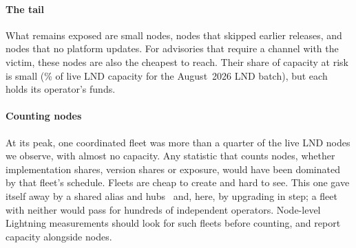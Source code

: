 \paragraph{The tail}
What remains exposed are small nodes, nodes that skipped earlier releases, and nodes that no platform updates. For
advisories that require a channel with the victim, these nodes are also the cheapest to reach. Their share of
capacity at risk is small (\ExpCapLLBatchDisc\% of live LND capacity for the August~2026 LND batch), but each holds its
operator's funds.

\paragraph{Counting nodes}
At its peak, one coordinated fleet was more than a quarter of the live LND nodes we observe, with almost no
capacity. Any statistic that counts nodes, whether implementation shares, version shares or exposure, would have been
dominated by that fleet's schedule. Fleets are cheap to create and hard to see. This one gave itself away by a shared
alias and hubs~\cite{kumar2026clientdiversity} and, here, by upgrading in step; a fleet with neither would pass for
hundreds of independent operators. Node-level Lightning measurements should look for such fleets before counting,
and report capacity alongside nodes.

